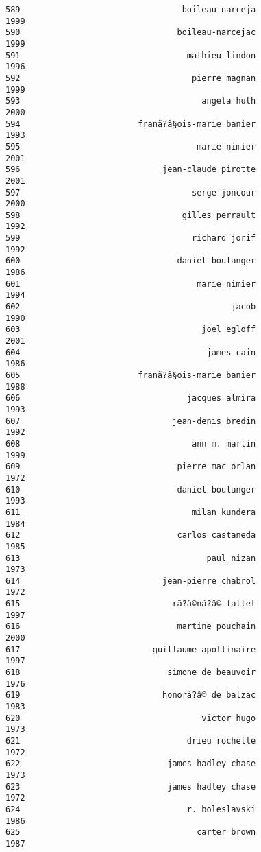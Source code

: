 \documentclass[
]{report}
\begin{document}
\begin{verbatim}
589                                 boileau-narceja                1999
590                                boileau-narcejac                1999
591                                  mathieu lindon                1996
592                                   pierre magnan                1999
593                                     angela huth                2000
594                        franã?â§ois-marie banier                1993
595                                    marie nimier                2001
596                             jean-claude pirotte                2001
597                                   serge joncour                2000
598                                 gilles perrault                1992
599                                   richard jorif                1992
600                                daniel boulanger                1986
601                                    marie nimier                1994
602                                           jacob                1990
603                                     joel egloff                2001
604                                      james cain                1986
605                        franã?â§ois-marie banier                1988
606                                  jacques almira                1993
607                               jean-denis bredin                1992
608                                   ann m. martin                1999
609                                pierre mac orlan                1972
610                                daniel boulanger                1993
611                                   milan kundera                1984
612                                carlos castaneda                1985
613                                      paul nizan                1973
614                             jean-pierre chabrol                1972
615                               rã?â©nã?â© fallet                1997
616                                martine pouchain                2000
617                           guillaume apollinaire                1997
618                              simone de beauvoir                1976
619                             honorã?â© de balzac                1983
620                                     victor hugo                1973
621                                  drieu rochelle                1972
622                              james hadley chase                1973
623                              james hadley chase                1972
624                                  r. boleslavski                1986
625                                    carter brown                1987

\end{verbatim}
\end{document}
